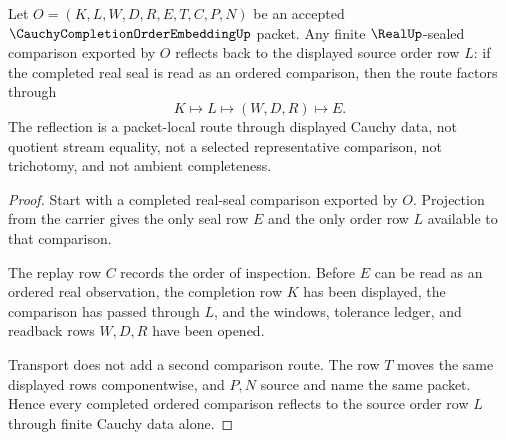 \begin{theorem}
\label{thm:cauchy-completion-order-embedding-order-reflection}
Let $O=(K,L,W,D,R,E,T,C,P,N)$ be an accepted $\CauchyCompletionOrderEmbeddingUp$ packet. Any finite $\RealUp$-sealed comparison exported by $O$ reflects back to the displayed source order row $L$: if the completed real seal is read as an ordered comparison, then the route factors through
$$
K \longmapsto L \longmapsto (W,D,R) \longmapsto E .
$$
The reflection is a packet-local route through displayed Cauchy data, not quotient stream equality, not a selected representative comparison, not trichotomy, and not ambient completeness.
\end{theorem}
\begin{proof}
Start with a completed real-seal comparison exported by $O$. Projection from the carrier gives the only seal row $E$ and the only order row $L$ available to that comparison.

The replay row $C$ records the order of inspection. Before $E$ can be read as an ordered real observation, the completion row $K$ has been displayed, the comparison has passed through $L$, and the windows, tolerance ledger, and readback rows $W,D,R$ have been opened.

Transport does not add a second comparison route. The row $T$ moves the same displayed rows componentwise, and $P,N$ source and name the same packet. Hence every completed ordered comparison reflects to the source order row $L$ through finite Cauchy data alone.
\end{proof}

